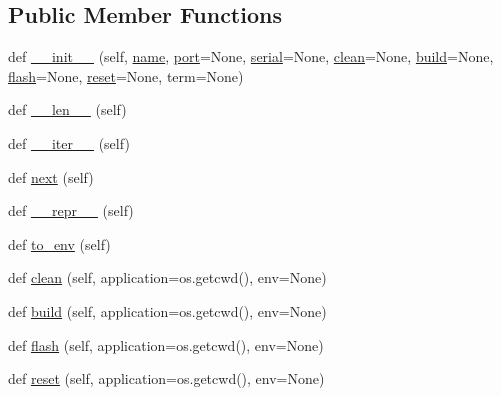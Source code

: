 \subsection*{Public Member Functions}
\begin{DoxyCompactItemize}
\item 
def \hyperlink{class01-run_1_1Board_ad35a808e040817150bcd922b6c0aeeef}{\+\_\+\+\_\+init\+\_\+\+\_\+} (self, \hyperlink{class01-run_1_1Board_a6b12d2aef3623e3f594334510cfd11f9}{name}, \hyperlink{class01-run_1_1Board_a48c43d64d519839c4f5872e48a59e208}{port}=None, \hyperlink{class01-run_1_1Board_a51cd30d7dd75df818803f51e7de5e65d}{serial}=None, \hyperlink{class01-run_1_1Board_a5208ba82fe3d549ad715f076f80e8a95}{clean}=None, \hyperlink{class01-run_1_1Board_a7384c947a93c980b8930e253cb9492b6}{build}=None, \hyperlink{class01-run_1_1Board_a346a3b43b4c418d28e45b4d12c21daa9}{flash}=None, \hyperlink{class01-run_1_1Board_af3100703094b97416c251b63f57f2bca}{reset}=None, term=None)
\item 
def \hyperlink{class01-run_1_1Board_a35dc2156ebd2a65834bd10bdf66bb09b}{\+\_\+\+\_\+len\+\_\+\+\_\+} (self)
\item 
def \hyperlink{class01-run_1_1Board_a311f9a412930bb08696c8567eadb6630}{\+\_\+\+\_\+iter\+\_\+\+\_\+} (self)
\item 
def \hyperlink{class01-run_1_1Board_a0164186ab77c5f622ce7ef3c0420e5dd}{next} (self)
\item 
def \hyperlink{class01-run_1_1Board_a690fa2302f0ab8d9b77830909764b267}{\+\_\+\+\_\+repr\+\_\+\+\_\+} (self)
\item 
def \hyperlink{class01-run_1_1Board_af07e45d6e66e6d947abeadff7eb6bb87}{to\+\_\+env} (self)
\item 
def \hyperlink{class01-run_1_1Board_a5208ba82fe3d549ad715f076f80e8a95}{clean} (self, application=os.\+getcwd(), env=None)
\item 
def \hyperlink{class01-run_1_1Board_a7384c947a93c980b8930e253cb9492b6}{build} (self, application=os.\+getcwd(), env=None)
\item 
def \hyperlink{class01-run_1_1Board_a346a3b43b4c418d28e45b4d12c21daa9}{flash} (self, application=os.\+getcwd(), env=None)
\item 
def \hyperlink{class01-run_1_1Board_af3100703094b97416c251b63f57f2bca}{reset} (self, application=os.\+getcwd(), env=None)
\end{DoxyCompactItemize}
